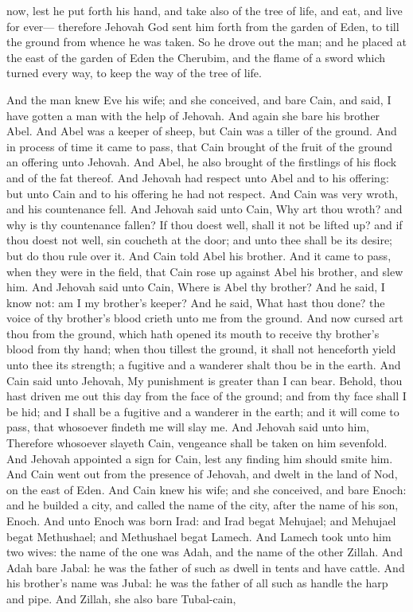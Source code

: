 now, lest he put forth his hand, and take also of the tree of life, and eat, and live for ever— therefore Jehovah God sent him forth from the garden of Eden, to till the ground from whence he was taken. So he drove out the man; and he placed at the east of the garden of Eden the Cherubim, and the flame of a sword which turned every way, to keep the way of the tree of life. 

And the man knew Eve his wife; and she conceived, and bare Cain, and said, I have gotten a man with the help of Jehovah. And again she bare his brother Abel. And Abel was a keeper of sheep, but Cain was a tiller of the ground. And in process of time it came to pass, that Cain brought of the fruit of the ground an offering unto Jehovah. And Abel, he also brought of the firstlings of his flock and of the fat thereof. And Jehovah had respect unto Abel and to his offering: but unto Cain and to his offering he had not respect. And Cain was very wroth, and his countenance fell. And Jehovah said unto Cain, Why art thou wroth? and why is thy countenance fallen? If thou doest well, shall it not be lifted up? and if thou doest not well, sin coucheth at the door; and unto thee shall be its desire; but do thou rule over it. And Cain told Abel his brother. And it came to pass, when they were in the field, that Cain rose up against Abel his brother, and slew him.  And Jehovah said unto Cain, Where is Abel thy brother? And he said, I know not: am I my brother’s keeper? And he said, What hast thou done? the voice of thy brother’s blood crieth unto me from the ground. And now cursed art thou from the ground, which hath opened its mouth to receive thy brother’s blood from thy hand; when thou tillest the ground, it shall not henceforth yield unto thee its strength; a fugitive and a wanderer shalt thou be in the earth. And Cain said unto Jehovah, My punishment is greater than I can bear. Behold, thou hast driven me out this day from the face of the ground; and from thy face shall I be hid; and I shall be a fugitive and a wanderer in the earth; and it will come to pass, that whosoever findeth me will slay me. And Jehovah said unto him, Therefore whosoever slayeth Cain, vengeance shall be taken on him sevenfold. And Jehovah appointed a sign for Cain, lest any finding him should smite him.  And Cain went out from the presence of Jehovah, and dwelt in the land of Nod, on the east of Eden. And Cain knew his wife; and she conceived, and bare Enoch: and he builded a city, and called the name of the city, after the name of his son, Enoch. And unto Enoch was born Irad: and Irad begat Mehujael; and Mehujael begat Methushael; and Methushael begat Lamech. And Lamech took unto him two wives: the name of the one was Adah, and the name of the other Zillah. And Adah bare Jabal: he was the father of such as dwell in tents and have cattle. And his brother’s name was Jubal: he was the father of all such as handle the harp and pipe. And Zillah, she also bare Tubal-cain, 